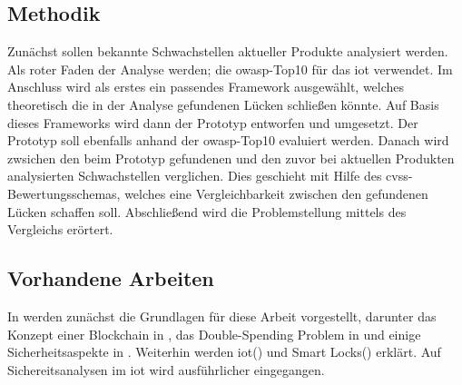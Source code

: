     \subsection{Methodik}
    \label{sec:problem_methods}
        Zunächst sollen bekannte Schwachstellen aktueller Produkte analysiert werden.
        Als roter Faden der Analyse werden; die \gls{owasp}-Top10 für das \gls{iot}\cite{Miessler2015a} verwendet.
        Im Anschluss wird als erstes ein passendes Framework ausgewählt, welches theoretisch die in der Analyse gefundenen Lücken schließen könnte.
        Auf Basis dieses Frameworks wird dann der Prototyp entworfen und umgesetzt.
        Der Prototyp soll ebenfalls anhand der \gls{owasp}-Top10 evaluiert werden.
        Danach wird zwsichen den beim Prototyp gefundenen und den zuvor bei aktuellen Produkten analysierten Schwachstellen verglichen.
        Dies geschieht mit Hilfe des \gls{cvss}-Bewertungsschemas, welches eine Vergleichbarkeit zwischen den gefundenen Lücken schaffen soll.
        Abschließend wird die Problemstellung mittels des Vergleichs erörtert.
    
    \subsection{Vorhandene Arbeiten}
    \label{sec:problem_relatedWork}

	\vspace{3em}    
	\noindent In  werden zunächst die Grundlagen für diese Arbeit vorgestellt, darunter das Konzept einer Blockchain in , das Double-Spending Problem in  und einige Sicherheitsaspekte in .
	Weiterhin werden \gls{iot}() und Smart Locks() erklärt.
	Auf Sichereitsanalysen im \gls{iot} wird ausführlicher eingegangen.
